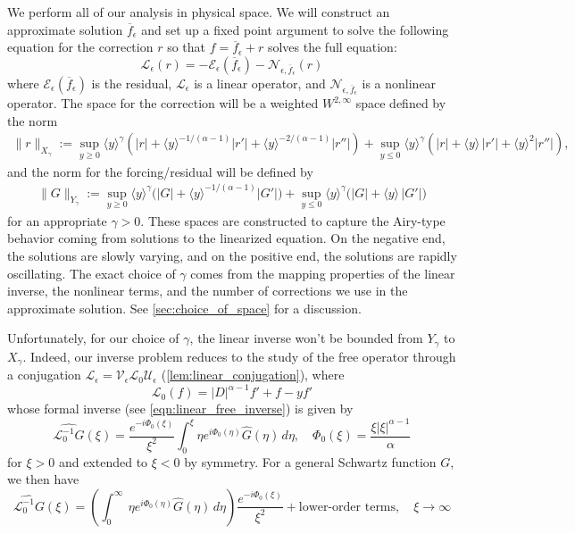 \documentclass[11pt]{amsart}
\theoremstyle{definition}
\theoremstyle{remark}
\numberwithin{equation}{section}
\newcommand{\mc}[1]{\mathcal{#1}}
\newcommand{\ov}[1]{\overline{#1}}
\newcommand{\ang}[1]{\langle #1 \rangle}
\begin{document}
We perform all of our analysis in physical space. We will construct an approximate solution $\ov{f}_\epsilon$ and set up a fixed point argument to solve the following equation for the correction $r$ so that $f = \ov{f}_\epsilon + r$ solves the full equation:
\[\mc{L}_\epsilon(r) = -\mc{E}_\epsilon(\ov{f}_\epsilon) - \mc{N}_{\epsilon, \ov{f}_\epsilon}(r)\]
where $\mc{E}_\epsilon(\ov{f}_\epsilon)$ is the residual, $\mc{L}_\epsilon$ is a linear operator, and $\mc{N}_{\epsilon, \ov{f}_\epsilon}$ is a nonlinear operator. The space for the correction will be a weighted $W^{2,\infty}$ space defined by the norm 
\[\begin{split}
 \|r\|_{X_\gamma} :=\sup_{y\ge0}\ang{y}^\gamma(|r|+\ang{y}^{-1/(\alpha - 1)}|r'|+\ang{y}^{-2/(\alpha - 1)}|r''|) +\sup_{y\le0}\ang{y}^\gamma(|r|+\ang{y}\,|r'|+\ang{y}^2|r''|),
 \end{split}\]
and the norm for the forcing/residual will be defined by 
\[
\begin{aligned}
 \|G\|_{Y_\gamma} := \sup_{y \geq 0}\ang{y}^\gamma\bigl(|G|+\ang{y}^{-1/(\alpha - 1)}|G'|\bigr) +\sup_{y\le0}\ang{y}^\gamma\bigl(|G|+\ang{y}\,|G'|\bigr)
 \end{aligned}
\]
for an appropriate $\gamma > 0$. These spaces are constructed to capture the Airy-type behavior coming from solutions to the linearized equation. On the negative end, the solutions are slowly varying, and on the positive end, the solutions are rapidly oscillating.
The exact choice of $\gamma$ comes from the mapping properties of the linear inverse, the nonlinear terms, and the number of corrections we use in the approximate solution. See \cref{sec:choice_of_space} for a discussion.
\par
Unfortunately, for our choice of $\gamma$, the linear inverse won't be bounded from $Y_\gamma$ to $X_\gamma$. Indeed, our inverse problem reduces to the study of the free operator through a conjugation $\mc{L}_\epsilon = \mc{V}_\epsilon \mc{L}_0 \mc{U}_\epsilon$ (\cref{lem:linear_conjugation}), where
\[\mc{L}_0(f) = |D|^{\alpha - 1}f' + f - yf'\]
whose formal inverse (see \eqref{eqn:linear_free_inverse}) is given by 
\[\widehat{\mc{L}_0^{-1} G}(\xi) = \frac{e^{-i\Phi_0(\xi)}}{\xi^2}\int_{0}^{\xi}\eta e^{i\Phi_0(\eta)} \widehat{G}(\eta) \, d\eta, \quad \Phi_0(\xi) = \frac{\xi|\xi|^{\alpha - 1}}{\alpha}\]
for $\xi > 0$ and extended to $\xi < 0$ by symmetry. For a general Schwartz function $G$, we then have 
\[\widehat{\mc{L}_0^{-1} G}(\xi) = \left(\int_{0}^\infty\ \eta e^{i\Phi_0(\eta)} \widehat{G}(\eta) \,d\eta\right)\frac{e^{-i\Phi_0(\xi)}}{\xi^2} + \text{lower-order terms}, \quad \xi \to \infty\]
\end{document}
